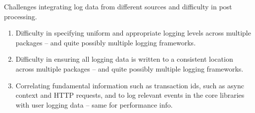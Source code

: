 \noindent
Challenges integrating log data from different sources and difficulty in post processing.
\begin{enumerate}
\item Difficulty in specifying uniform and appropriate logging levels across 
    multiple packages -- and quite possibly multiple logging frameworks.
\item Difficulty in ensuring all logging data is written to a consistent location 
    across multiple packages -- and quite possibly multiple logging frameworks.
\item Correlating fundamental information such as  
    transaction ids, such as async context and HTTP requests, and to log relevant 
    events in the core libraries with user logging data -- same for performance info.
\end{enumerate}

